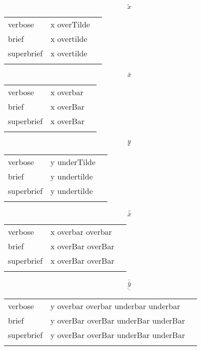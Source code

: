 \R
\E \[\tilde{x}\]
\begin{longtable}[c]{@{}lll@{}}
\toprule\addlinespace
verbose & x overTilde &

\\\addlinespace
brief & x overtilde &

\\\addlinespace
superbrief & x overtilde &

\\\addlinespace
\bottomrule
\end{longtable}


\E \[\bar{x}\]
\begin{longtable}[c]{@{}lll@{}}
\toprule\addlinespace
verbose & x overbar &

\\\addlinespace
brief & x overBar &

\\\addlinespace
superbrief & x overBar &

\\\addlinespace
\bottomrule
\end{longtable}


\E \[\underaccent{\tilde}{y}\]
\begin{longtable}[c]{@{}lll@{}}
\toprule\addlinespace
verbose & y underTilde &

\\\addlinespace
brief & y undertilde &

\\\addlinespace
superbrief & y undertilde &

\\\addlinespace
\bottomrule
\end{longtable}


\R
\E \[\bar{\bar{x}}\]
\begin{longtable}[c]{@{}lll@{}}
\toprule\addlinespace
verbose & x overbar overbar &

\\\addlinespace
brief & x overBar overBar &

\\\addlinespace
superbrief & x overBar overBar &

\\\addlinespace
\bottomrule
\end{longtable}


\E \[\bar{\underline{\bar{\underbar{y}}}}\]
\begin{longtable}[c]{@{}lll@{}}
\toprule\addlinespace
verbose & y overbar overbar underbar underbar &

\\\addlinespace
brief & y overBar overBar underBar underBar &

\\\addlinespace
superbrief & y overBar overBar underBar underBar &

\\\addlinespace
\bottomrule
\end{longtable}


